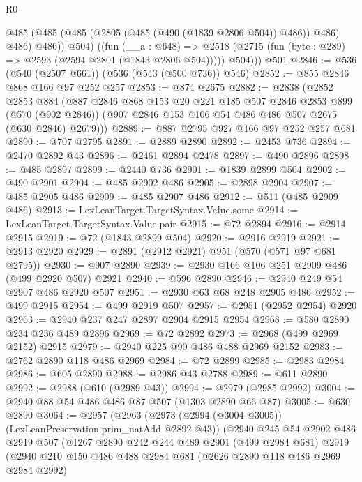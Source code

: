 \begin{lexlean}{R0}
\begin{coremodule}
{{{{{{{{{{{{{{{{{{{          @485 (@485 (@485 (@2805 (@485 (@490 (@1839 @2806 @504)) @486)) @486) @486) @486))
          @504)
        ((fun (__a : @648) =>
        @2518 (@2715 (fun (byte : @289) => @2593 (@2594 @2801 (@1843 @2806 @504)))))
          @504)))
    @501
@2846 := @536 (@540 (@2507 @661)) (@536 (@543 (@500 @736)) @546)
@2852 := @855 @2846 @868 @166 @97 @252 @257
@2853 := @874 @2675
@2882 := @2838
    (@2852
      @2853
      @884
      (@887
        @2846
        @868
        @153
        @20
        @221
        @185
        @507
        @2846
        @2853
        @899
        (@570 (@902 @2846))
        (@907 @2846 @153 @106 @54 @486 @486 @507 @2675 (@630 @2846) @2679)))
@2889 := @887 @2795 @927 @166 @97 @252 @257 @681
@2890 := @707 @2795
@2891 := @2889 @2890
@2892 := @2453 @736
@2894 := @2470 @2892 @43
@2896 := @2461 @2894 @2478
@2897 := @490 @2896
@2898 := @485 @2897
@2899 := @2440 @736
@2901 := @1839 @2899 @504
@2902 := @490 @2901
@2904 := @485 @2902 @486
@2905 := @2898 @2904
@2907 := @485 @2905 @486
@2909 := @485 @2907 @486
@2912 := @511 (@485 @2909 @486)
@2913 := LexLeanTarget.TargetSyntax.Value.some
@2914 := LexLeanTarget.TargetSyntax.Value.pair
@2915 := @72 @2894
@2916 := @2914 @2915
@2919 := @72 (@1843 @2899 @504)
@2920 := @2916 @2919
@2921 := @2913 @2920
@2929 := @2891 (@2912 @2921) @951 (@570 (@571 @97 @681 @2795))
@2930 := @907 @2890
@2939 := @2930 @166 @106 @251 @2909 @486 (@499 @2920 @507) @2921
@2940 := @596 @2890
@2946 := @2940 @249 @54 @2907 @486 @2920 @507
@2951 := @2930 @63 @68 @248 @2905 @486
@2952 := @499 @2915
@2954 := @499 @2919 @507
@2957 := @2951 (@2952 @2954) @2920
@2963 := @2940 @237 @247 @2897 @2904 @2915 @2954
@2968 := @580 @2890 @234 @236 @489 @2896
@2969 := @72 @2892
@2973 := @2968 (@499 @2969 @2152) @2915
@2979 := @2940 @225 @90 @486 @488 @2969 @2152
@2983 := @2762 @2890 @118 @486 @2969
@2984 := @72 @2899
@2985 := @2983 @2984
@2986 := @605 @2890
@2988 := @2986 @43 @2788
@2989 := @611 @2890
@2992 := @2988 (@610 (@2989 @43))
@2994 := @2979 (@2985 @2992)
@3004 := @2940 @88 @54 @486 @486 @87 @507 (@1303 @2890 @66 @87)
@3005 := @630 @2890
@3064 := @2957
    (@2963
      (@2973 (@2994 (@3004 @3005)) (LexLeanPreservation.prim_natAdd @2892 @43))
      (@2940
        @245
        @54
        @2902
        @486
        @2919
        @507
        (@1267
          @2890
          @242
          @244
          @489
          @2901
          (@499 @2984 @681)
          @2919
          (@2940
            @210
            @150
            @486
            @488
            @2984
            @681
            (@2626 @2890 @118 @486 @2969 @2984 @2992)
}}}}}}}}}}}}}}}}}}}
\end{coremodule}
\end{lexlean}
